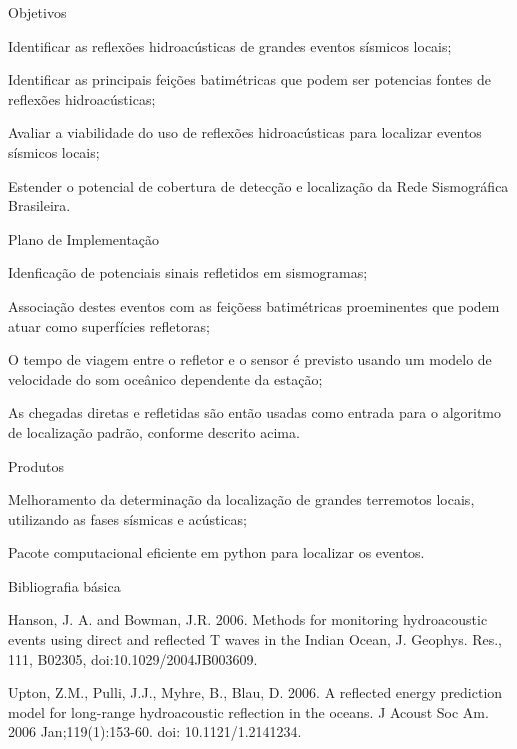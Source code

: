 \documentclass[10pt,a4paper,oneside]{book}
\begin{document}
\begin{fancyenum}{\faFutbol}{Objetivos}
	\item Identificar as reflexões hidroacústicas de grandes eventos sísmicos locais;
	\item Identificar as principais feições batimétricas que podem ser potencias fontes de reflexões hidroacústicas;
	\item Avaliar a viabilidade do uso de reflexões hidroacústicas para localizar eventos sísmicos locais;
	\item Estender o potencial de cobertura de detecção e localização da Rede Sismográfica Brasileira.
\end{fancyenum}

\begin{fancyenum}{\faBrain}{Plano de Implementação}
	\item Idenficação de potenciais sinais refletidos em sismogramas;
	\item Associação destes eventos com as feiçõess batimétricas proeminentes que podem atuar como superfícies refletoras;
	\item O tempo de viagem entre o refletor e o sensor é previsto usando um modelo de velocidade do som oceânico dependente da estação;
	\item As chegadas diretas e refletidas são então usadas como entrada para o algoritmo de localização padrão, conforme descrito acima.
\end{fancyenum}

\begin{fancyenum}{\faShoppingCart}{Produtos}
	\item Melhoramento da determinação da localização de grandes terremotos locais, utilizando as fases sísmicas e acústicas;
	\item Pacote computacional eficiente em python para localizar os eventos.
\end{fancyenum}

\begin{fancyenum}{\faBook}{Bibliografia básica}
	\item Hanson, J. A. and Bowman, J.R.  2006. Methods for monitoring hydroacoustic events using direct and reflected T waves in the Indian Ocean, J. Geophys. Res., 111, B02305, doi:10.1029/2004JB003609.
	\item Upton, Z.M., Pulli, J.J., Myhre, B., Blau, D. 2006. A reflected energy prediction model for long-range hydroacoustic reflection in the oceans. J Acoust Soc Am. 2006 Jan;119(1):153-60. doi: 10.1121/1.2141234.
\end{fancyenum}
\end{document}
